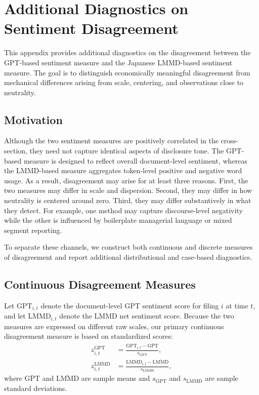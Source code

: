 \section{Additional Diagnostics on Sentiment Disagreement}
\label{app:disagreement_diagnostics}

This appendix provides additional diagnostics on the disagreement between the
GPT-based sentiment measure and the Japanese LMMD-based sentiment measure.
The goal is to distinguish economically meaningful disagreement from mechanical
differences arising from scale, centering, and observations close to neutrality.

\subsection{Motivation}
\label{app:disagreement_motivation}

Although the two sentiment measures are positively correlated in the cross-section,
they need not capture identical aspects of disclosure tone. The GPT-based measure
is designed to reflect overall document-level sentiment, whereas the LMMD-based
measure aggregates token-level positive and negative word usage. As a result,
disagreement may arise for at least three reasons. First, the two measures may
differ in scale and dispersion. Second, they may differ in how neutrality is
centered around zero. Third, they may differ substantively in what they detect. For example, one
method may capture discourse-level negativity while the other is influenced by
boilerplate managerial language or mixed segment reporting.

To separate these channels, we construct both continuous and discrete measures of
disagreement and report additional distributional and case-based diagnostics.

\subsection{Continuous Disagreement Measures}
\label{app:disagreement_continuous}

Let $\text{GPT}_{i,t}$ denote the document-level GPT sentiment score for filing
$i$ at time $t$, and let $\text{LMMD}_{i,t}$ denote the LMMD net sentiment score.
Because the two measures are expressed on different raw scales, our primary
continuous disagreement measure is based on standardized scores:
\begin{align}
z^{\text{GPT}}_{i,t} &= \frac{\text{GPT}_{i,t} - \overline{\text{GPT}}}{s_{\text{GPT}}}, \\
z^{\text{LMMD}}_{i,t} &= \frac{\text{LMMD}_{i,t} - \overline{\text{LMMD}}}{s_{\text{LMMD}}},
\end{align}
where $\overline{\text{GPT}}$ and $\overline{\text{LMMD}}$ are sample means and
$s_{\text{GPT}}$ and $s_{\text{LMMD}}$ are sample standard deviations.

